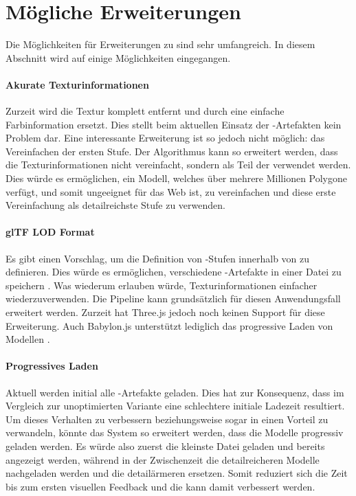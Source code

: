 \section{Mögliche Erweiterungen}
Die Möglichkeiten für Erweiterungen zu  sind sehr umfangreich. In diesem Abschnitt wird auf einige Möglichkeiten eingegangen.

\paragraph{Akurate Texturinformationen}
Zurzeit wird die Textur komplett entfernt und durch eine einfache Farbinformation ersetzt. Dies stellt beim aktuellen Einsatz der -Artefakten kein Problem dar. Eine interessante Erweiterung ist so jedoch nicht möglich: das Vereinfachen der ersten Stufe. Der Algorithmus kann so erweitert werden, dass die Texturinformationen nicht vereinfacht, sondern als Teil der  verwendet werden. Dies würde es ermöglichen, ein Modell, welches über mehrere Millionen Polygone verfügt, und somit ungeeignet für das Web ist, zu vereinfachen und diese erste Vereinfachung als detailreichste Stufe zu verwenden.

\paragraph{glTF LOD Format}
Es gibt einen Vorschlag, um die Definition von -Stufen innerhalb von  zu definieren. Dies würde es ermöglichen, verschiedene -Artefakte in einer Datei zu speichern \cite{glTFExtensionLOD}. Was wiederum erlauben würde, Texturinformationen einfacher wiederzuverwenden. Die Pipeline kann grundsätzlich für diesen Anwendungsfall erweitert werden.
Zurzeit hat Three.js jedoch noch keinen Support für diese Erweiterung. Auch Babylon.js unterstützt lediglich das progressive Laden von Modellen \cite{babylonProgressiveLoading}.

\paragraph{Progressives Laden}
Aktuell werden initial alle -Artefakte geladen. Dies hat zur Konsequenz, dass im Vergleich zur unoptimierten Variante eine schlechtere initiale Ladezeit resultiert. Um dieses Verhalten zu verbessern beziehungsweise sogar in einen Vorteil zu verwandeln, könnte das System so erweitert werden, dass die Modelle progressiv geladen werden. Es würde also zuerst die kleinste Datei geladen und bereits angezeigt werden, während in der Zwischenzeit die detailreicheren Modelle nachgeladen werden und die detailärmeren ersetzen. Somit reduziert sich die Zeit bis zum ersten visuellen Feedback und die  kann damit verbessert werden.


